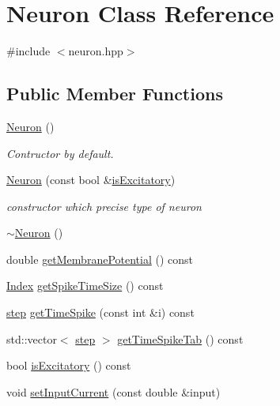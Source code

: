 \hypertarget{classNeuron}{\section{Neuron Class Reference}
\label{classNeuron}
}


{\ttfamily \#include $<$neuron.\-hpp$>$}

\subsection*{Public Member Functions}
\begin{DoxyCompactItemize}
\item 
\hyperlink{classNeuron_a823487d01615fadb8ac19a2768dd9d96}{Neuron} ()
\begin{DoxyCompactList}\small\item\em Contructor by default. \end{DoxyCompactList}\item 
\hyperlink{classNeuron_a2e40248fde544ffd0b2d93131d2d11f2}{Neuron} (const bool \&\hyperlink{classNeuron_a65f5868f9a2ddc2414a5880f28b76d4c}{is\-Excitatory})
\begin{DoxyCompactList}\small\item\em constructor which precise type of neuron \end{DoxyCompactList}\item 
\hyperlink{classNeuron_a94a250ce7e167760e593979b899745b1}{$\sim$\-Neuron} ()
\item 
double \hyperlink{classNeuron_a86341dee7a81765fe4840777a008c688}{get\-Membrane\-Potential} () const 
\item 
\hyperlink{constant_8hpp_a5d7deb06d9443e7d4a47bf078638cc91}{Index} \hyperlink{classNeuron_a7cc795b7e11d2de6dc7deb8c30b42822}{get\-Spike\-Time\-Size} () const 
\item 
\hyperlink{constant_8hpp_a58a8d380569868e765017aef9c749646}{step} \hyperlink{classNeuron_a8d9daa0300ab78408e8b4c4d1b04705b}{get\-Time\-Spike} (const int \&i) const 
\item 
std\-::vector$<$ \hyperlink{constant_8hpp_a58a8d380569868e765017aef9c749646}{step} $>$ \hyperlink{classNeuron_a35f338de50267c40039e1c38bc927a52}{get\-Time\-Spike\-Tab} () const 
\item 
bool \hyperlink{classNeuron_a65f5868f9a2ddc2414a5880f28b76d4c}{is\-Excitatory} () const 
\item 
void \hyperlink{classNeuron_a098ab2d61d98e2288e1f42c27717f0e0}{set\-Input\-Current} (const double \&input)
\item 

\end{DoxyCompactItemize}
